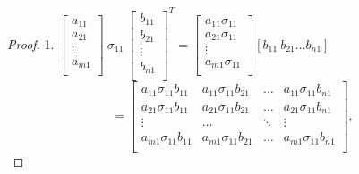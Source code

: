 \documentclass[12pt,a4paper]{report}
\begin{document}
\begin{proof}
1.
$\left[ \begin{array}{c}
         a_{11} \\
         a_{21} \\
         \vdots \\
         a_{m1} \\
         \end{array}
      \right] \: \sigma_{11} \: \left[ \begin{array}{c}
         b_{11} \\
         b_{21} \\
         \vdots \\
         b_{n1} \\
         \end{array}
      \right]^T = \left[
        \begin{array}{c}
         a_{11} \sigma_{11} \\
         a_{21} \sigma_{11} \\
         \vdots \\
         a_{m1} \sigma_{11} \\
         \end{array}
      \right] [b_{11} \: b_{21} \ldots b_{n1}]$
      $$ =  \left[
        \begin{array}{cccc}
         a_{11} \sigma_{11} b_{11}  & a_{11} \sigma_{11} b_{21} & \ldots & a_{11} \sigma_{11} b_{n1}  \\
         a_{21} \sigma_{11} b_{11} & a_{21} \sigma_{11} b_{21} & \ldots & a_{21} \sigma_{11} b_{n1} \\
         \vdots & \ldots & \ddots & \vdots \\
         a_{m1} \sigma_{11} b_{11} & a_{m1} \sigma_{11} b_{21} & \ldots & a_{m1} \sigma_{11} b_{n1} \\
         \end{array}
      \right], $$


\end{proof}
\end{document}
